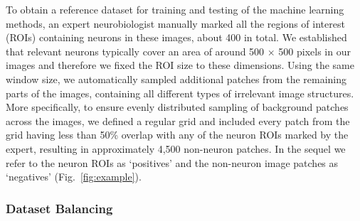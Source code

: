 To obtain a reference dataset for training and testing of the machine learning methods, an expert neurobiologist manually marked all the regions of interest (ROIs) containing neurons in these images, about 400 in total. We established that relevant neurons typically cover an area of around 500 $\times$ 500 pixels in our images and therefore we fixed the ROI size to these dimensions. Using the same window size, we automatically sampled additional patches from the remaining parts of the images, containing all different types of irrelevant image structures. More specifically, to ensure evenly distributed sampling of background patches across the images, we defined a regular grid and included every patch from the grid having less than 50\% overlap with any of the neuron ROIs marked by the expert, resulting in approximately 4,500 non-neuron patches. In the sequel we refer to the neuron ROIs as `positives' and the non-neuron image patches as `negatives' (Fig.\ \ref{fig:example}).

\subsubsection{Dataset Balancing}
\label{sec:balanced}

